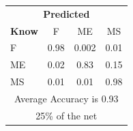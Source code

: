 \documentclass[12pt]{article} %
\begin{document}
\begin{minipage}{0.5\textwidth}
\begin{center}
\begin{tabular}{l|c|c|c|}
 \multicolumn{4}{c}{ \textbf{ Predicted}}\\
 \textbf{Know}&F&ME&MS\\ \hline\hline
F   &0.98&0.002&0.01\\
ME &0.02&0.83&0.15\\
MS &0.01&0.01&0.98\\
\multicolumn{4}{c}{Average Accuracy is 0.93}\\
\multicolumn{4}{c}{25\%  of the net}\\
\end{tabular}
\end{center}
\end{minipage}
\end{document}
